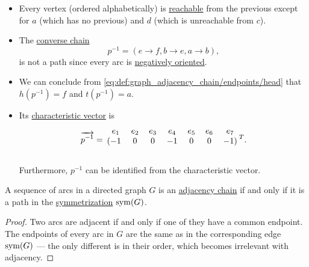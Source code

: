 \begin{example}
\begin{itemize}
    \item Every vertex (ordered alphabetically) is \hyperref[def:graph_directed_path/reachability]{reachable} from the previous except for \( a \) (which has no previous) and \( d \) (which is unreachable from \( c \)).

    \item The \hyperref[def:graph_adjacency_chain/converse]{converse chain}
    \begin{equation*}
      p^{-1} = (e \to f, b \to e, a \to b),
    \end{equation*}
    is not a path since every arc is \hyperref[def:graph_adjacency_chain/orientation]{negatively oriented}.

    \item We can conclude from \eqref{eq:def:graph_adjacency_chain/endpoints/head} that \( h(p^{-1}) = f \) and \( t(p^{-1}) = a \).

    \item Its \hyperref[def:graph_directed_path/characteristic_vector]{characteristic vector} is
    \begin{equation*}
      \vect{p^{-1}}
      =
      \begin{blockarray}{ccccccrl}
        e_1 & e_2 & e_3 & e_4 & e_5 & e_6 & e_7 \\
      \begin{block}{(ccccccr)l}
        -1  & 0   & 0   & -1  & 0   & 0   & -1 \\
      \end{block}
      \end{blockarray}
      {}^T.
    \end{equation*}

    Furthermore, \( p^{-1} \) can be identified from the characteristic vector.
  \end{itemize}
\end{example}

\begin{proposition}\label{thm:graph_chain_symmetrization}
  A sequence of arcs in a directed graph \( G \) is an \hyperref[def:graph_adjacency_chain]{adjacency chain} if and only if it is a path in the \hyperref[rem:undirected_graphs_as_directed]{symmetrization} \( \operatorname{sym}(G) \).
\end{proposition}
\begin{proof}
  Two arcs are adjacent if and only if one of they have a common endpoint. The endpoints of every arc in \( G \) are the same as in the corresponding edge \( \operatorname{sym}(G) \) --- the only different is in their order, which becomes irrelevant with adjacency.
\end{proof}

